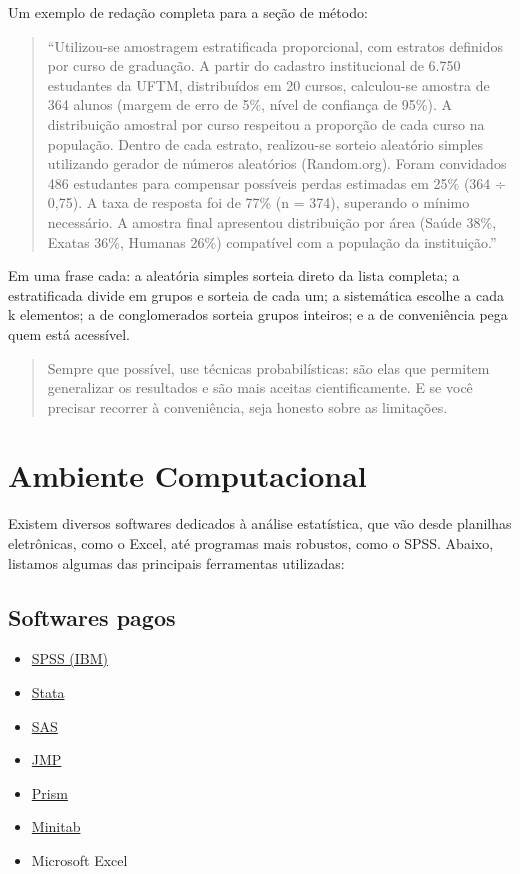 \documentclass[
]{book}
\providecommand{\tightlist}{%
  \setlength{\itemsep}{0pt}\setlength{\parskip}{0pt}}
\begin{document}
Um exemplo de redação completa para a seção de método:

\begin{quote}
``Utilizou-se amostragem estratificada proporcional, com estratos definidos por curso de graduação. A partir do cadastro institucional de 6.750 estudantes da UFTM, distribuídos em 20 cursos, calculou-se amostra de 364 alunos (margem de erro de 5\%, nível de confiança de 95\%). A distribuição amostral por curso respeitou a proporção de cada curso na população. Dentro de cada estrato, realizou-se sorteio aleatório simples utilizando gerador de números aleatórios (Random.org). Foram convidados 486 estudantes para compensar possíveis perdas estimadas em 25\% (364 ÷ 0,75). A taxa de resposta foi de 77\% (n = 374), superando o mínimo necessário. A amostra final apresentou distribuição por área (Saúde 38\%, Exatas 36\%, Humanas 26\%) compatível com a população da instituição.''
\end{quote}

Em uma frase cada: a aleatória simples sorteia direto da lista completa; a estratificada divide em grupos e sorteia de cada um; a sistemática escolhe a cada k elementos; a de conglomerados sorteia grupos inteiros; e a de conveniência pega quem está acessível.

\begin{quote}
Sempre que possível, use técnicas probabilísticas: são elas que permitem generalizar os resultados e são mais aceitas cientificamente. E se você precisar recorrer à conveniência, seja honesto sobre as limitações.
\end{quote}

\chapter{Ambiente Computacional}\label{ambiente-computacional}

Existem diversos softwares dedicados à análise estatística, que vão desde planilhas eletrônicas, como o Excel, até programas mais robustos, como o SPSS. Abaixo, listamos algumas das principais ferramentas utilizadas:

\section{Softwares pagos}\label{softwares-pagos}

\begin{itemize}
\tightlist
\item
  \href{https://www.ibm.com/br-pt/spss}{SPSS (IBM)}
\item
  \href{https://www.stata-brasil.com/software/stata.html}{Stata}
\item
  \href{https://www.sas.com/pt_br}{SAS}
\item
  \href{https://www.jmp.com/}{JMP}
\item
  \href{https://software.com.br/p/prism}{Prism}
\item
  \href{https://osbsoftware.com.br/produto/minitab-statistical-software}{Minitab}
\item
  Microsoft Excel
\end{itemize}
\end{document}
